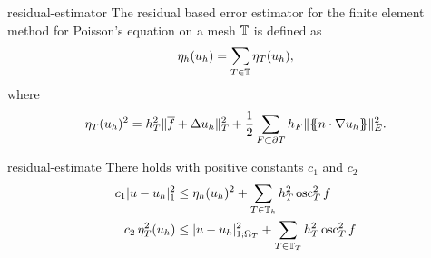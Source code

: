 \begin{Definition}{residual-estimator}
  The residual based error estimator for the finite element method for
  Poisson's equation on a mesh $\mathbb T$ is defined as
  \begin{gather}
    \eta_{h}(u_h) = \sum_{T\in\mathbb T} \eta_{T}(u_h),
  \end{gather}
  where
  \begin{gather}
    \eta_{T}(u_h)^2 = h_{T}^2 \lVert\overline f + \Delta u_h\rVert_T^2
    + \frac12 \sum_{F\subset \partial T} h_F\lVert\{\!\!\{n\cdot\nabla u_h\}\!\!\}\rVert_E^2.
  \end{gather}
\end{Definition}

\begin{Theorem}{residual-estimate}
  There holds with positive constants $c_1$ and $c_2$
  \begin{align}
    c_1 \lvert u-u_h\rvert_1^2
    &\le \eta_{h}(u_h)^2
      + \sum_{T\in\mathbb T_h} h^2_T\operatorname{osc}_T^2 f
    \\
    c_2 \,\eta_T^2(u_h)
    &\le \lvert u-u_h\rvert_{1;\Omega_{T}}^2
      + \sum_{T\in\mathbb T_T} h^2_T\operatorname{osc}_T^2 f
  \end{align}
\end{Theorem}

